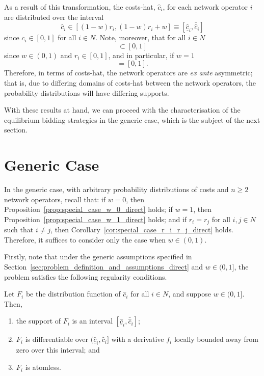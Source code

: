 As a result of this transformation, the costs-hat, $\hat{c}_i$, for each network operator $i$ are distributed over the interval
\begin{equation*}
  \hat{c}_i\in [(1-w)r_i, (1-w)r_i + w]\equiv [\underline{\hat{c}}_i, \bar{\hat{c}}_i]
\end{equation*}
since $c_i\in [0,1]$ for all $i\in N$. Note, moreover, that for all $i\in N$
\begin{equation*}
  [\underline{\hat{c}}_i, \bar{\hat{c}}_i] \subset [0,1]
\end{equation*}
since $w\in (0,1)$ and $r_i\in [0,1]$, and in particular, if $w=1$
\begin{equation*}
  [\underline{\hat{c}}_i, \bar{\hat{c}}_i] = [0,1].
\end{equation*}
Therefore, in terms of costs-hat, the network operators are \emph{ex ante} asymmetric; that is, due to differing domains of costs-hat between the network operators, the probability distributions will have differing supports.

With these results at hand, we can proceed with the characterisation of the equilibrium bidding strategies in the generic case, which is the subject of the next section.

\section{Generic Case} %
\label{sec:generic_case_indirect}
In the generic case, with arbitrary probability distributions of costs and $n\ge 2$ network operators, recall that: if $w=0$, then Proposition~\ref{prop:special_case_w_0_direct} holds; if $w=1$, then Proposition~\ref{prop:special_case_w_1_direct} holds; and if $r_i=r_j$ for all $i,j\in N$ such that $i\neq j$, then Corollary~\ref{cor:special_case_r_i_r_j_direct} holds. Therefore, it suffices to consider only the case when $w\in (0,1)$.

Firstly, note that under the generic assumptions specified in Section~\ref{sec:problem_definition_and_assumptions_direct} and $w\in (0,1]$, the problem satisfies the following regularity conditions.
\begin{proposition}
\label{prop:regularity_conditions_indirect}
Let $F_i$ be the distribution function of $\hat{c}_i$ for all $i\in N$, and suppose $w\in (0,1]$. Then,
\begin{enumerate}
  \item the support of $F_i$ is an interval ${[\underline{\hat{c}}_i, \bar{\hat{c}}_i]}$;
  \item $F_i$ is differentiable over ${(\underline{\hat{c}}_i, \bar{\hat{c}}_i]}$ with a derivative $f_i$ locally bounded away from zero over this interval; and
  \item $F_i$ is atomless.
\end{enumerate}
\end{proposition}

